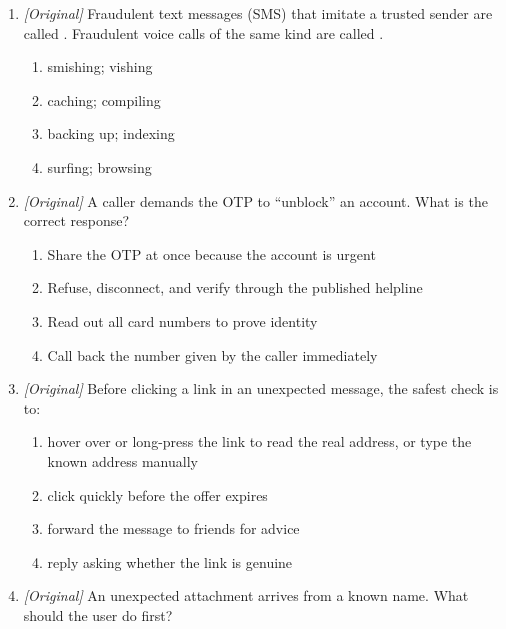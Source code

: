 \documentclass[11pt]{article}
\begin{document}
\begin{enumerate}[label=\textbf{Q\arabic*.}, leftmargin=*]
\begin{enumerate}[label=\Alph*.]
    \item baiting
    \item compiling
    \item sorting
    \item archiving
  \end{enumerate}
\item \textit{[Original]} Fraudulent text messages (SMS) that imitate a
  trusted sender are called \underline{\hspace{1.6cm}}.
  Fraudulent voice calls of the same kind are called
  \underline{\hspace{1.6cm}}.
  \begin{enumerate}[label=\Alph*.]
    \item smishing; vishing
    \item caching; compiling
    \item backing up; indexing
    \item surfing; browsing
  \end{enumerate}
\item \textit{[Original]} A caller demands the OTP to ``unblock'' an
  account. What is the correct response?
  \begin{enumerate}[label=\Alph*.]
    \item Share the OTP at once because the account is urgent
    \item Refuse, disconnect, and verify through the published helpline
    \item Read out all card numbers to prove identity
    \item Call back the number given by the caller immediately
  \end{enumerate}
\item \textit{[Original]} Before clicking a link in an unexpected message,
  the safest check is to:
  \begin{enumerate}[label=\Alph*.]
    \item hover over or long-press the link to read the real address, or type the known address manually
    \item click quickly before the offer expires
    \item forward the message to friends for advice
    \item reply asking whether the link is genuine
  \end{enumerate}
\item \textit{[Original]} An unexpected attachment arrives from a known
  name. What should the user do first?
  \begin{enumerate}[label=\Alph*.]

\end{enumerate}
\end{enumerate}
\end{document}
